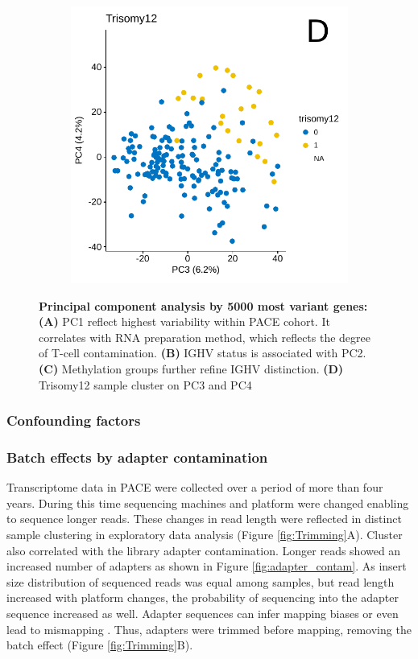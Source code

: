\begin{figure}
\begin{subfigure}[t]{0.45\columnwidth}
		\subcaption*{}
		\label{fig:pca_Methylation}
	\end{subfigure}
	\quad
	\begin{subfigure}[b]{0.45\columnwidth}
		\includegraphics[width=0.8\columnwidth]{./Figures/pca_trisomy12.pdf}
		\subcaption*{}
		\label{fig:pca_trisomy12}
	\end{subfigure}
	\caption{\textbf{Principal component analysis by 5000 most variant genes:} \textbf{(A)} PC1 reflect highest variability within PACE cohort. It correlates with RNA preparation method, which reflects the degree of T-cell contamination. \textbf{(B)} IGHV status is associated with PC2. \textbf{(C)} Methylation groups further refine IGHV distinction. \textbf{(D)} Trisomy12 sample cluster on PC3 and PC4 }
	\label{fig:pca}
\end{figure}


\FloatBarrier

\subsubsection{Confounding factors}

\subsubsection{Batch effects by adapter contamination}
Transcriptome data in PACE were collected over a period of more than four years. During this time sequencing machines and platform were changed enabling to sequence longer reads. These changes in read length were reflected in distinct sample clustering in exploratory data analysis (Figure \ref{fig:Trimming}A). Cluster also correlated with the library adapter contamination. Longer reads showed an increased number of adapters as shown in Figure \ref{fig:adapter_contam}. As insert size distribution of sequenced reads was equal among samples, but read length increased with platform changes, the probability of sequencing into the adapter sequence increased as well. Adapter sequences can infer mapping biases or even lead to mismapping \citep{Sturm}. Thus, adapters were trimmed before mapping, removing the batch effect (Figure \ref{fig:Trimming}B).   

